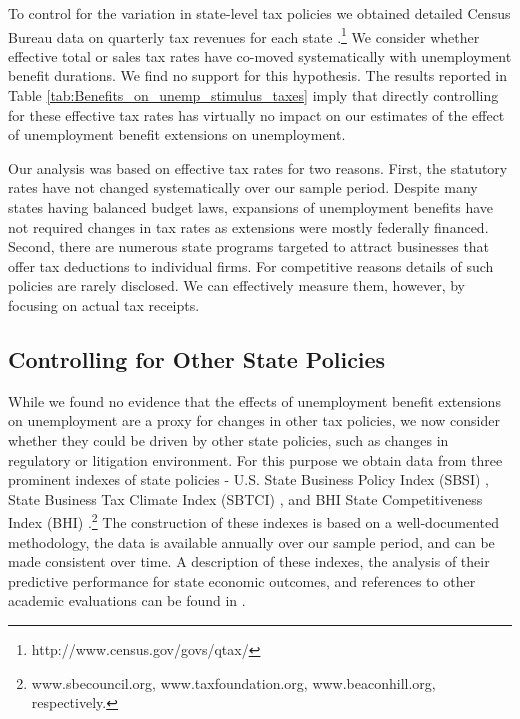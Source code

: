 \documentclass[12pt]{article}
\newcommand{\1}{\mathbf{1}}
\begin{document}
\begin{appendix}
To control for the variation in state-level tax policies we obtained detailed Census Bureau data on quarterly tax revenues for each state \citep{data:census-qtax}.\footnote{http://www.census.gov/govs/qtax/} We consider whether effective total or sales tax rates have co-moved systematically with unemployment benefit durations. We find no support for this hypothesis. The results reported in Table \ref{tab:Benefits_on_unemp_stimulus_taxes} imply that directly controlling for these effective tax rates has virtually no impact on our estimates of the effect of unemployment benefit extensions on unemployment.

Our analysis was based on effective tax rates for two reasons. First, the statutory rates have not changed systematically over our sample period. Despite many states having balanced budget laws, expansions of unemployment benefits have not required changes in tax rates as extensions were mostly federally financed. Second, there are numerous state programs targeted to attract businesses that offer tax deductions to individual firms. For competitive reasons details of such policies are rarely disclosed. We can effectively measure them, however, by focusing on actual tax receipts.


\subsection{Controlling for Other State Policies}


While we found no evidence that the effects of unemployment benefit extensions on unemployment are a proxy for changes in other tax policies, we now consider whether they could be driven by other state policies, such as changes in regulatory or litigation environment. For this purpose we obtain data from three prominent indexes of state policies - U.S. State Business Policy Index (SBSI) \citep{data:sbec-sbsi}, State Business Tax Climate Index (SBTCI) \citep{data:tf-sbtc}, and BHI State Competitiveness Index (BHI) \citep{data:bhi-competitiveness}.\footnote{www.sbecouncil.org, www.taxfoundation.org, www.beaconhill.org, respectively.}  The construction of these indexes is based on a well-documented methodology, the data is available annually over our sample period, and can be made consistent over time. A description of these indexes, the analysis of their predictive performance for state economic outcomes, and references to other academic evaluations can be found in \citet{kolko+neumark+mejia:13}.



\end{appendix}
\end{document}
